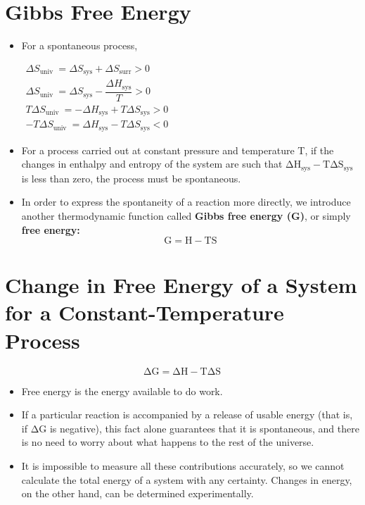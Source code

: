 \documentclass[a4paper,12pt,twocolumn]{article}
\begin{document}
\section{Gibbs Free Energy}
\begin{itemize}
\item For a spontaneous process,
\begin{Box1}{}
$\begin{array}{c}
\Delta S_{\text {univ }}=\Delta S_{\mathrm{sys}}+\Delta S_{\mathrm{surr}}>0 \\
\Delta S_{\text {univ }}=\Delta S_{\mathrm{sys}}- \dfrac{\Delta H_{\mathrm{sys}}}{T}>0 \\
T \Delta S_{\text {univ }}=-\Delta H_{\mathrm{sys}}+T \Delta S_{\mathrm{sys}}>0 \\
-T \Delta S_{\text {univ }}=\Delta H_{\mathrm{sys}}-T \Delta S_{\mathrm{sys}}<0
\end{array}$
\end{Box1}
\item For a process carried out at constant pressure and temperature T, if the changes in enthalpy and entropy of the system are such that $\mathrm{\Delta H_{\mathrm{sys}}-T \Delta S_{\mathrm{sys}}}$ is less than zero, the process must be spontaneous.
\item In order to express the spontaneity of a reaction more directly, we introduce another thermodynamic function called \textbf{Gibbs free energy (G)}, or simply \textbf{free energy:}
$$\mathrm{G = H - TS}$$
\end{itemize}

\section{Change in Free Energy of a System for a Constant-Temperature Process}
$$\mathrm{\Delta G = \Delta H - T \Delta S}$$
\begin{itemize}
\item Free energy is the energy available to do work. 
\item If a particular reaction is accompanied by a release of usable energy (that is, if $\mathrm{\Delta G}$ is negative), this fact alone guarantees that it is spontaneous, and there is no need to worry about what happens to the rest of the universe. 
\item It is impossible to measure all these contributions accurately, so we cannot calculate the total energy of a system with any certainty.  Changes in energy, on the other hand, can be determined experimentally.
\end{itemize}
\end{document}
